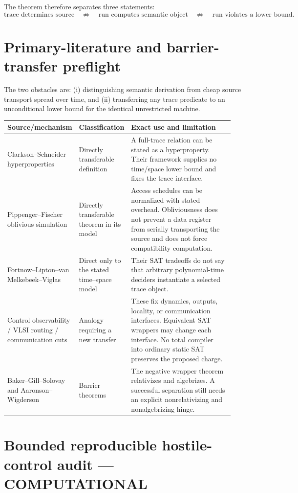 \documentclass[11pt]{article}
\newcommand{\COMP}{\textbf{COMPUTATIONAL}}
\begin{document}
The theorem therefore separates three statements:
\[
 \text{trace determines source}
 \quad\not\Rightarrow\quad
 \text{run computes semantic object}
 \quad\not\Rightarrow\quad
 \text{run violates a lower bound}.
\]

\section{Primary-literature and barrier-transfer preflight}

The two obstacles are: (i) distinguishing semantic derivation from cheap
source transport spread over time, and (ii) transferring any trace predicate
to an unconditional lower bound for the identical unrestricted machine.

\begin{longtable}{@{}p{0.24\linewidth}p{0.18\linewidth}p{0.50\linewidth}@{}}
\toprule
Source/mechanism & Classification & Exact use and limitation\\ \midrule
Clarkson--Schneider hyperproperties \cite{hyper} & Directly transferable definition & A full-trace relation can be stated as a hyperproperty.  Their framework supplies no time/space lower bound and fixes the trace interface.\\
Pippenger--Fischer oblivious simulation \cite{pf} & Directly transferable theorem in its model & Access schedules can be normalized with stated overhead.  Obliviousness does not prevent a data register from serially transporting the source and does not force compatibility computation.\\
Fortnow--Lipton--van Melkebeek--Viglas \cite{flmv} & Direct only to the stated time--space model & Their SAT tradeoffs do not say that arbitrary polynomial-time deciders instantiate a selected trace object.\\
Control observability / VLSI routing / communication cuts & Analogy requiring a new transfer & These fix dynamics, outputs, locality, or communication interfaces.  Equivalent SAT wrappers may change each interface.  No total compiler into ordinary static SAT preserves the proposed charge.\\
Baker--Gill--Solovay and Aaronson--Wigderson \cite{bgs,aw} & Barrier theorems & The negative wrapper theorem relativizes and algebrizes.  A successful separation still needs an explicit nonrelativizing and nonalgebrizing hinge.\\
\bottomrule
\end{longtable}

\section{Bounded reproducible hostile-control audit --- \COMP}
\end{document}
